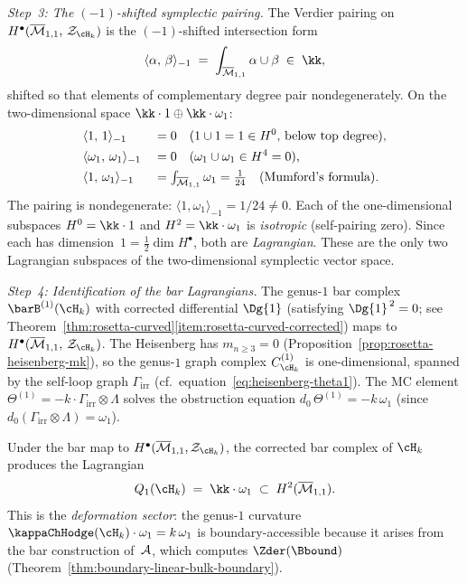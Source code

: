 \begin{computation}
\medskip
\noindent
\textit{Step~3: The $(-1)$-shifted symplectic pairing.}\enspace
The Verdier pairing on $H^\bullet(\Mbar_{1,1},\,\cZ_{\cH_k})$
is the $(-1)$-shifted intersection form
\[
\langle \alpha,\, \beta \rangle_{-1}
\;=\;
\int_{\Mbar_{1,1}} \alpha \cup \beta
\;\in\; \kk,
\]
shifted so that elements of complementary degree pair
nondegenerately. On the two-dimensional space
$\kk \cdot 1 \oplus \kk \cdot \omega_1$:
\begin{alignat*}{2}
&\langle 1,\, 1 \rangle_{-1} &&= 0
 \quad\text{($1 \cup 1 = 1 \in H^0$, below top degree)},\\
&\langle \omega_1,\, \omega_1 \rangle_{-1} &&= 0
 \quad\text{($\omega_1 \cup \omega_1 \in H^4 = 0$)},\\
&\langle 1,\, \omega_1 \rangle_{-1} &&=
 \textstyle\int_{\overline{\mathcal{M}}_{1,1}} \omega_1 = \frac{1}{24}
 \quad\text{(Mumford's formula)}.
\end{alignat*}
The pairing is nondegenerate:
$\langle 1, \omega_1\rangle_{-1} = 1/24 \ne 0$.
Each of the one-dimensional subspaces
$H^0 = \kk \cdot 1$ and $H^2 = \kk \cdot \omega_1$ is
\emph{isotropic} (self-pairing zero). Since each has
dimension~$1 = \tfrac{1}{2}\dim H^\bullet$, both are
\emph{Lagrangian}. These are the only two Lagrangian
subspaces of the two-dimensional symplectic vector space.

\medskip
\noindent
\textit{Step~4: Identification of the bar Lagrangians.}\enspace
The genus-$1$ bar complex $\barB^{(1)}(\cH_k)$ with corrected
differential $\Dg{1}$ (satisfying $\Dg{1}^{\,2} = 0$; see
Theorem~\ref{thm:rosetta-curved}\ref{item:rosetta-curved-corrected})
maps to $H^\bullet(\Mbar_{1,1},\, \cZ_{\cH_k})$.
The Heisenberg has $m_{n \ge 3} = 0$
(Proposition~\ref{prop:rosetta-heisenberg-mk}),
so the genus-$1$ graph complex
$C^{(1)}_{\cH_k}$ is one-dimensional, spanned by the
self-loop graph $\Gamma_{\mathrm{irr}}$
(cf.\ equation~\eqref{eq:heisenberg-theta1}). The
MC element $\Theta^{(1)} = -k \cdot \Gamma_{\mathrm{irr}}
\otimes \Lambda$ solves the obstruction equation
$d_0\,\Theta^{(1)} = -k\,\omega_1$
(since $d_0(\Gamma_{\mathrm{irr}} \otimes \Lambda) = \omega_1$).

Under the bar map to $H^\bullet(\Mbar_{1,1},\cZ_{\cH_k})$,
the corrected bar complex
of $\cH_k$ produces the Lagrangian
\begin{equation}\label{eq:complementarity-Q1-Hk}
Q_1(\cH_k)
\;=\;
\kk \cdot \omega_1
\;\subset\;
H^2(\Mbar_{1,1}).
\end{equation}
This is the \emph{deformation sector}: the genus-$1$ curvature
$\kappaChHodge(\cH_k)\cdot\omega_1 = k\,\omega_1$ is boundary-accessible
because it arises from the bar construction of~$\mathcal{A}$, which
computes $\Zder(\Bbound)$
(Theorem~\ref{thm:boundary-linear-bulk-boundary}).


\end{computation}
